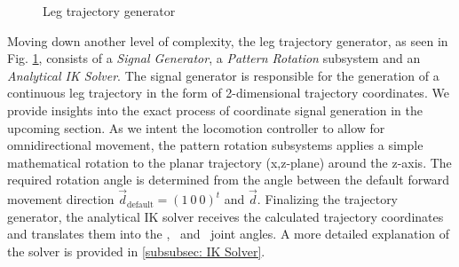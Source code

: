 \begin{figure}
	\centerline{}
	\caption[Leg Trajectory Generator]{Leg trajectory generator}
	\label{figure: Leg trajectory generator}
\end{figure}

Moving down another level of complexity, the leg trajectory generator, as seen in Fig. \ref{figure: Leg trajectory generator}, consists of a \textit{Signal Generator}, a \textit{Pattern Rotation} subsystem and an \textit{Analytical IK Solver}.
The signal generator is responsible for the generation of a continuous leg trajectory in the form of 2-dimensional trajectory coordinates.
We provide insights into the exact process of coordinate signal generation in the upcoming section.
As we intent the locomotion controller to allow for omnidirectional movement, the pattern rotation subsystems applies a simple mathematical rotation to the planar trajectory (x,z-plane) around the z-axis.
The required rotation angle is determined from the angle between the default forward movement direction $\vec{d}_\text{default} = (1 \ 0 \ 0)^t$ and $\vec{d}$.
Finalizing the trajectory generator, the analytical IK solver receives the calculated trajectory coordinates and translates them into the \textalpha, \textbeta \ and \textgamma \ joint angles.
A more detailed explanation of the solver is provided in \ref{subsubsec: IK Solver}.


